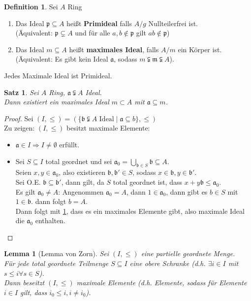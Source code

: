 \documentclass[10pt,a4paper]{article}
\newcounter{thm}[section]
\theoremstyle{definition}
\newtheorem{definition}[thm]{Definition}
\theoremstyle{plain}
\newtheorem{lem}[thm]{Lemma}
\newtheorem{satz}[thm]{Satz}
\theoremstyle{remark}
\begin{document}
\begin{definition}
	Sei $A$ Ring
	\begin{enumerate}
		\item Das Ideal $\mathfrak p\subseteq A$ heißt \textbf{Primideal} falls $A/g$ Nullteilerfrei ist.\\
		(Äquivalent: $\mathfrak p\subsetneq A$ und für alle $a,b\notin\mathfrak p$ gilt $ab\notin\mathfrak p$)
		\item Das Ideal $m\subseteq A$ heißt \textbf{maximales Ideal}, falls $A/m$ ein Körper ist.\\
		(Äquivalent: Es gibt kein Ideal $\mathfrak a$, sodass $m\subsetneqq\mathfrak m\subsetneqq A$).
	\end{enumerate}
	Jedes Maximale Ideal ist Primideal.
\end{definition}

\begin{satz}
	Sei $A$ Ring, $\mathfrak a\subsetneqq A$ Ideal.\\
	Dann existiert ein maximales Ideal $m\subset A$ mit $\mathfrak a\subseteq m$.
\end{satz}
\begin{proof}
	Sei $(I,\leq)=\left(\{\text{$\mathfrak b\subsetneqq A$ Ideal}\mid\mathfrak a\subseteq b\},\leq \right)$\\
	Zu zeigen: $(I,\leq)$ besitzt maximale Elemente:
	\begin{itemize}
		\item $\mathfrak a\in I\Rightarrow I\neq \emptyset$ erfüllt.
		\item Sei $S\subseteq I$ total geordnet und sei $\mathfrak a_0=\bigcup_{\mathfrak b\in S}\mathfrak b\subseteq A$.\\
		Seien $x,y\in\mathfrak a_0$, also existieren $\mathfrak b,\mathfrak b'\in S$, sodass $x\in \mathfrak b,y\in\mathfrak b'$.\\
		Sei O.E. $\mathfrak b\subseteq\mathfrak b'$, dann gilt, da $S$ total geordnet ist, dass $x+y\mathfrak b\leq \mathfrak a_0$.\\
		Es gilt $\mathfrak a_0\neq A$: Angenommen $\mathfrak a_0=A$, dann $1\in \mathfrak a_0$, dann gibt es $b\in S$ mit $1\in\mathfrak b$. dann folgt $b=A$.\\
		Dann folgt mit \ref{104LemZorn}, dass es ein maximales Elemente gibt, also maximale Ideal die $\mathfrak a_0$ enthalten.
	\end{itemize}
\end{proof}


\begin{lem}[Lemma von Zorn]\label{104LemZorn}
	Sei $(I,\leq)$ eine partielle geordnete Menge.\\
	Für jede total geordnete Teilmenge $S\subseteq I$  eine obere Schranke (d.h. $\exists i\in I$ mit $s\leq i\forall s\in S$).\\
	Dann beseitzt $(I,\leq)$ maximale Elemente (d.h. Elemente, sodass für Elemente $i\in I$ gilt, dass $i_0\leq i,i\neq i_0$).
\end{lem}
\end{document}
